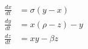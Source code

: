 \documentclass[preview]{standalone}
\begin{document}
\begin{align*}
\begin{aligned}
            \frac{d x }{dt} &= \sigma( y - x ) \\
            \frac{d y }{dt} &=  x (\rho- z )- y  \\
            \frac{d z }{dt} &=  x y -\beta  z 
            \end{aligned}
\end{align*}
\end{document}
